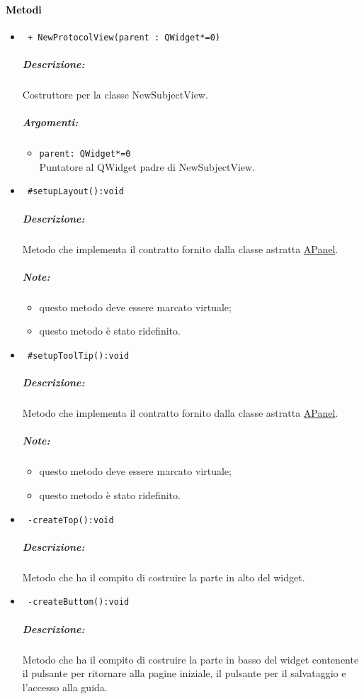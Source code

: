 \paragraph{\textcolor{black}{Metodi\\}}
\begin{itemize}
\item \color{blue}\verb! + NewProtocolView(parent : QWidget*=0)!
\color{black}
\subparagraph{Descrizione:}
Costruttore per la classe NewSubjectView.
\subparagraph{Argomenti:}
\begin{itemize}
\item \color{RoyalPurple}\verb!parent: QWidget*=0 ! \\ Puntatore al QWidget padre di NewSubjectView.
\end{itemize}

\item \color{blue}\verb! #setupLayout():void!
\color{black} 
\subparagraph{Descrizione:}Metodo che implementa il contratto fornito dalla classe astratta \hyperref[speAPanel]{APanel}.
\subparagraph{Note:}
\begin{itemize}
\item questo metodo deve essere marcato virtuale;
\item questo metodo è stato ridefinito.
\end{itemize}

\item\color{blue}\verb! #setupToolTip():void!

\color{black}
\subparagraph{Descrizione:} Metodo che implementa il contratto fornito dalla classe astratta \hyperref[speAPanel]{APanel}.
 \subparagraph{Note:}
 \begin{itemize}
 \item questo metodo deve essere marcato virtuale;
 \item questo metodo è stato ridefinito.
 \end{itemize}
\item \color{blue}\verb! -createTop():void!
\color{black}
\subparagraph{Descrizione:}Metodo che ha il compito di costruire la parte in alto del widget.

\item \color{blue}\verb! -createButtom():void!
\color{black}
\subparagraph{Descrizione:}Metodo che ha il compito di costruire la parte in basso del widget contenente il pulsante per ritornare alla pagine iniziale, il pulsante per il salvataggio e l'accesso alla guida.
 

\end{itemize}
